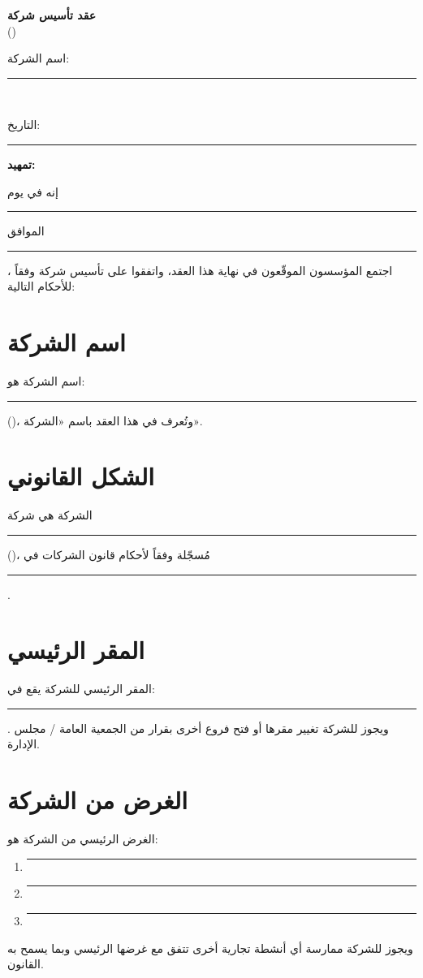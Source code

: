 \documentclass[12pt,a4paper]{article}
\begin{document}
\begin{center}
{\LARGE\bfseries عقد تأسيس شركة}\\[0.5em]
{\large ()}\\[1em]
{\normalsize اسم الشركة: \rule{6cm}{0.4pt}}\\[0.3em]
{\normalsize التاريخ: \rule{4cm}{0.4pt}}
\end{center}

\vspace{1.5em}

\noindent\textbf{تمهيد:}

\noindent إنه في يوم \rule{2cm}{0.4pt} الموافق \rule{3cm}{0.4pt}، اجتمع المؤسسون الموقّعون في نهاية هذا العقد، واتفقوا على تأسيس شركة وفقاً للأحكام التالية:

\vspace{1em}

\section{اسم الشركة}
\label{art:name}
اسم الشركة هو: \rule{6cm}{0.4pt} ()، وتُعرف في هذا العقد باسم «الشركة».

\section{الشكل القانوني}
\label{art:form}
الشركة هي شركة \rule{4cm}{0.4pt} ()، مُسجّلة وفقاً لأحكام قانون الشركات في \rule{4cm}{0.4pt}.

\section{المقر الرئيسي}
\label{art:hq}
المقر الرئيسي للشركة يقع في: \rule{8cm}{0.4pt}. ويجوز للشركة تغيير مقرها أو فتح فروع أخرى بقرار من الجمعية العامة / مجلس الإدارة.

\section{الغرض من الشركة}
\label{art:purpose}
الغرض الرئيسي من الشركة هو:
\begin{enumerate}
    \item \rule{12cm}{0.4pt}
    \item \rule{12cm}{0.4pt}
    \item \rule{12cm}{0.4pt}
\end{enumerate}
ويجوز للشركة ممارسة أي أنشطة تجارية أخرى تتفق مع غرضها الرئيسي وبما يسمح به القانون.
\end{document}
